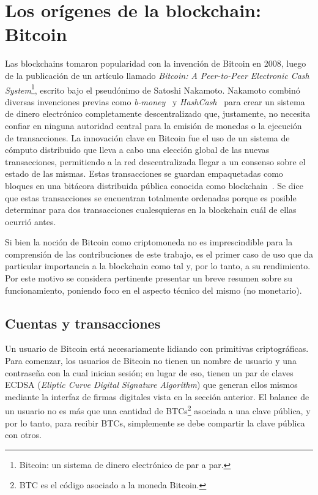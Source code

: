 \section{Los orígenes de la blockchain: Bitcoin}
Las blockchains tomaron popularidad con la invención de Bitcoin en 2008, luego de la publicación
de un artículo llamado \textit{Bitcoin: A Peer-to-Peer
Electronic Cash System}\footnote{Bitcoin: un sistema de dinero electrónico de par a par.}, escrito
bajo el pseudónimo de Satoshi Nakamoto.
Nakamoto combinó diversas invenciones previas como
\textit{b-money}~\cite{b.money} y \textit{HashCash}~\cite{hashcash} para crear un sistema de dinero electrónico completamente
descentralizado que, justamente, no necesita confiar en ninguna autoridad central para la emisión de monedas
o la ejecución de transacciones. 
La innovación clave en Bitcoin fue el uso de un sistema de cómputo distribuido que lleva
a cabo una elección global de las nuevas transacciones, permitiendo
a la red descentralizada llegar a un consenso sobre el estado de las mismas. Estas transacciones
se guardan empaquetadas como bloques en una bitácora distribuida pública conocida como blockchain~\cite{mastering.bitcoin}.
%
Se dice que estas transacciones se encuentran totalmente ordenadas porque es posible determinar para
dos transacciones cualesquieras en la blockchain cuál de ellas ocurrió antes.


%
Si bien la noción de Bitcoin como criptomoneda no es imprescindible para la comprensión de las
contribuciones de este trabajo, es el primer caso de uso que da particular importancia a la blockchain
como tal y, por lo tanto, a su rendimiento. Por este motivo se considera pertinente presentar un breve resumen sobre
su funcionamiento, poniendo foco en el aspecto técnico del mismo (no monetario).

\subsection{Cuentas y transacciones}

Un usuario de Bitcoin está necesariamente lidiando con primitivas criptográficas.
%
Para comenzar, los usuarios de Bitcoin no tienen un nombre de usuario y una contraseña
con la cual inician sesión; en lugar de eso, tienen un par de claves ECDSA (\textit{Eliptic
Curve Digital Signature Algorithm}) que generan ellos mismos mediante la interfaz de firmas
digitales vista en la sección anterior.
%
El balance de un usuario no es más que una cantidad de BTCs\footnote{BTC es el código asociado a la moneda Bitcoin.} asociada a una clave pública,
y por lo tanto, para recibir BTCs, simplemente se debe compartir la clave pública con otros.

